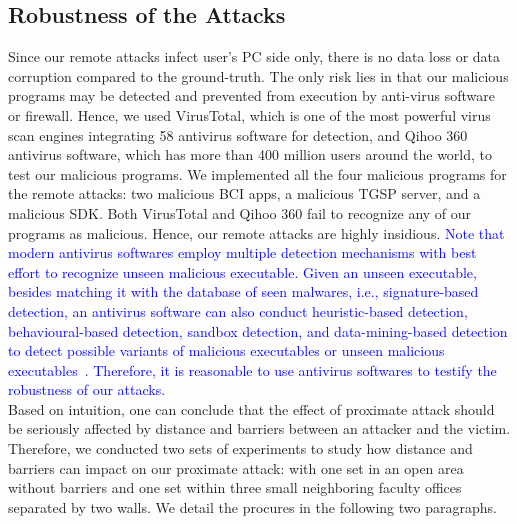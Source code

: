 \subsection{Robustness of the Attacks}
Since our remote attacks infect user's PC side only, there is no data loss or data corruption compared to the ground-truth. The only risk lies in that our malicious programs may be detected and prevented from execution by anti-virus software or firewall. Hence, we used VirusTotal, which is one of the most powerful virus scan engines integrating 58 antivirus software for detection, and Qihoo 360 antivirus software, which has more than 400 million users around the world, to test our malicious programs. We implemented all the four malicious programs for the remote attacks: two malicious BCI apps, a malicious TGSP server, and a malicious SDK. Both VirusTotal and Qihoo 360 fail to recognize any of our programs as malicious. Hence, our remote attacks are highly insidious. \textcolor{blue}{Note that modern antivirus softwares employ multiple detection mechanisms with best effort to recognize unseen malicious executable. Given an unseen executable, besides matching it with the database of seen malwares, i.e., signature-based detection, an antivirus software can also conduct heuristic-based detection, behavioural-based detection, sandbox detection, and data-mining-based detection to detect possible variants of malicious executables or unseen malicious executables~\cite{antivirusintro}. Therefore, it is reasonable to use antivirus softwares to testify the robustness of our attacks.}\\
%
\indent Based on intuition, one can conclude that the effect of proximate attack should be seriously affected by distance and barriers between an attacker and the victim. Therefore, we conducted two sets of experiments to study how distance and barriers can impact on our proximate attack: with one set in an open area without barriers and one set within three small neighboring faculty offices separated by two walls. We detail the procures in the following two paragraphs.\\
%
\indent
